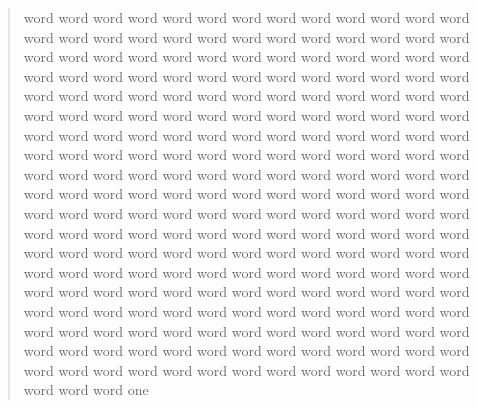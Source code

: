 \begin{abstract}
word word word word word word word word word word
word word word word word word word word word word
word word word word word word word word word word
word word word word word word word word word word
word word word word word word word word word word
word word word word word word word word word word
word word word word word word word word word word
word word word word word word word word word word
word word word word word word word word word word
word word word word word word word word word word
word word word word word word word word word word
word word word word word word word word word word
word word word word word word word word word word
word word word word word word word word word word
word word word word word word word word word word
word word word word word word word word word word
word word word word word word word word word word
word word word word word word word word word word
word word word word word word word word word word
word word word word word word word word word word
word word word word word word word word word word
word word word word word word word word word word
word word word word word word word word word word
word word word word word word word word word word
word word word word word word word word word word
one
\end{abstract}
